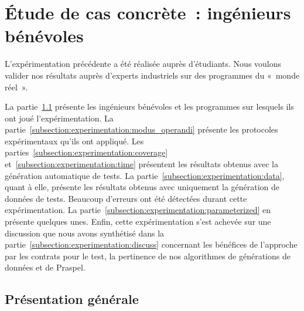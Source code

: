 \section{Étude de cas concrète~: ingénieurs bénévoles}
\label{section:experimentation:real}

L'expérimentation précédente a été réalisée auprès d'étudiants. Nous voulons
valider nos résultats auprès d'experts industriels sur des programmes du «~monde
réel~».

La partie~\ref{subsection:experimentation:presentation} présente les ingénieurs
bénévoles et les programmes sur lesquels ils ont joué l'expérimentation. La
partie~\ref{subsection:experimentation:modus_operandi} présente les protocoles
expérimentaux qu'ils ont appliqué. Les
parties~\ref{subsection:experimentation:coverage}
et~\ref{subsection:experimentation:time} présentent les résultats obtenus avec
la génération automatique de tests. La
partie~\ref{subsection:experimentation:data}, quant à elle, présente les
résultats obtenus avec uniquement la génération de données de tests. Beaucoup
d'erreurs ont été détectées durant cette expérimentation. La
partie~\ref{subsection:experimentation:parameterized} en présente quelques unes.
Enfin, cette expérimentation s'est achevée sur une discussion que nous avons
synthétisé dans la partie~\ref{subsection:experimentation:discuss} concernant
les bénéfices de l'approche par les contrats pour le test, la pertinence de nos
algorithmes de générations de données et de Praspel.

\subsection{Présentation générale}
\label{subsection:experimentation:presentation}

